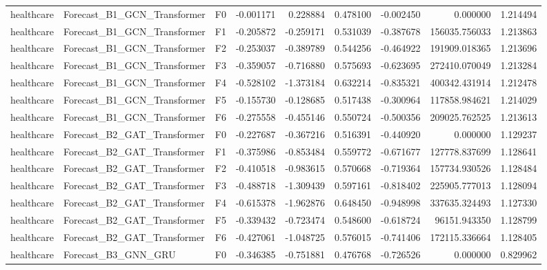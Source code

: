 \begin{tabular}{lllrrrrrr}
healthcare &  Forecast\_B1\_GCN\_Transformer &  F0 & -0.001171 &  0.228884 & 0.478100 & -0.002450 &         0.000000 &             1.214494 \\
healthcare &  Forecast\_B1\_GCN\_Transformer &  F1 & -0.205872 & -0.259171 & 0.531039 & -0.387678 &    156035.756033 &             1.213863 \\
healthcare &  Forecast\_B1\_GCN\_Transformer &  F2 & -0.253037 & -0.389789 & 0.544256 & -0.464922 &    191909.018365 &             1.213696 \\
healthcare &  Forecast\_B1\_GCN\_Transformer &  F3 & -0.359057 & -0.716880 & 0.575693 & -0.623695 &    272410.070049 &             1.213284 \\
healthcare &  Forecast\_B1\_GCN\_Transformer &  F4 & -0.528102 & -1.373184 & 0.632214 & -0.835321 &    400342.431914 &             1.212478 \\
healthcare &  Forecast\_B1\_GCN\_Transformer &  F5 & -0.155730 & -0.128685 & 0.517438 & -0.300964 &    117858.984621 &             1.214029 \\
healthcare &  Forecast\_B1\_GCN\_Transformer &  F6 & -0.275558 & -0.455146 & 0.550724 & -0.500356 &    209025.762525 &             1.213613 \\
healthcare &  Forecast\_B2\_GAT\_Transformer &  F0 & -0.227687 & -0.367216 & 0.516391 & -0.440920 &         0.000000 &             1.129237 \\
healthcare &  Forecast\_B2\_GAT\_Transformer &  F1 & -0.375986 & -0.853484 & 0.559772 & -0.671677 &    127778.837699 &             1.128641 \\
healthcare &  Forecast\_B2\_GAT\_Transformer &  F2 & -0.410518 & -0.983615 & 0.570668 & -0.719364 &    157734.930526 &             1.128484 \\
healthcare &  Forecast\_B2\_GAT\_Transformer &  F3 & -0.488718 & -1.309439 & 0.597161 & -0.818402 &    225905.777013 &             1.128094 \\
healthcare &  Forecast\_B2\_GAT\_Transformer &  F4 & -0.615378 & -1.962876 & 0.648450 & -0.948998 &    337635.324493 &             1.127330 \\
healthcare &  Forecast\_B2\_GAT\_Transformer &  F5 & -0.339432 & -0.723474 & 0.548600 & -0.618724 &     96151.943350 &             1.128799 \\
healthcare &  Forecast\_B2\_GAT\_Transformer &  F6 & -0.427061 & -1.048725 & 0.576015 & -0.741406 &    172115.336664 &             1.128405 \\
healthcare &          Forecast\_B3\_GNN\_GRU &  F0 & -0.346385 & -0.751881 & 0.476768 & -0.726526 &         0.000000 &             0.829962 \\

\end{tabular}
